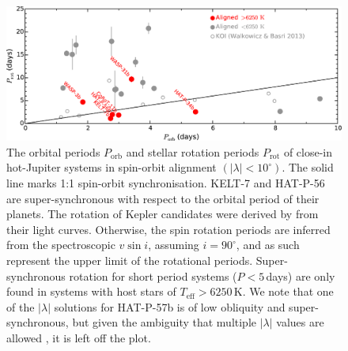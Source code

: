 \documentclass[useAMS,usenatbib]{mn2e}
\begin{document}
\begin{figure}
  \includegraphics[width=14cm]{plots/Porb_Prot.eps}
  \caption{\label{fig:porb_prot}The orbital periods $P_\text{orb}$ and stellar rotation periods $P_\text{rot}$ of close-in hot-Jupiter systems in spin-orbit alignment $(|\lambda| < 10^\circ)$. The solid line marks 1:1 spin-orbit synchronisation. KELT-7 and HAT-P-56 are super-synchronous with respect to the orbital period of their planets. The rotation of Kepler candidates were derived by \citet{2013MNRAS.436.1883W} from their light curves. Otherwise, the spin rotation periods are inferred from the spectroscopic $v\sin i$, assuming $i=90^\circ$, and as such represent the upper limit of the rotational periods. Super-synchronous rotation for short period systems ($P<5$\,days) are only found in systems with host stars of $T_\text{eff}>6250\,\text{K}$. We note that one of the $|\lambda|$ solutions for HAT-P-57b is of low obliquity and super-synchronous, but given the ambiguity that multiple $|\lambda|$ values are allowed \citep{2015AJ....150..197H}, it is left off the plot.}
\end{figure}
\end{document}
